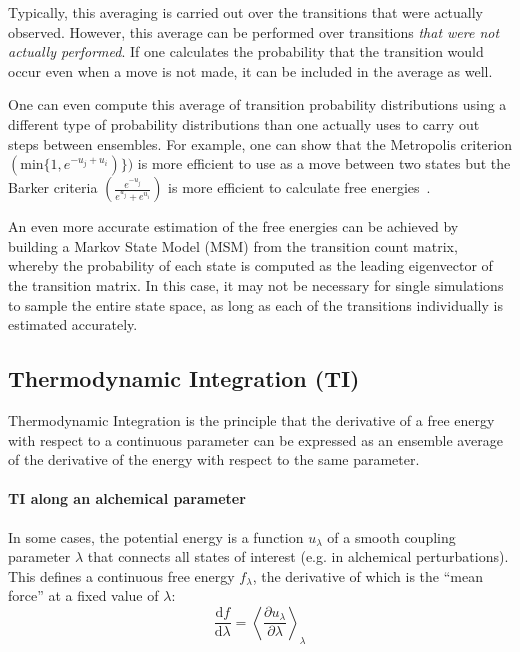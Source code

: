 \documentclass[9pt,review]{livecoms}
\begin{document}
Typically, this averaging is carried out over the transitions that were actually observed. However, this average can be performed over transitions \emph{that were not actually performed}. If one calculates the probability that the transition would occur even when a move is not made, it can be included in the average as well.

One can even compute this average of transition probability distributions using a different type of  probability distributions than one actually uses to carry out steps between ensembles. For example, one can show that the Metropolis criterion $(\mathrm{min} \{1,e^{-u_j+u_i})\})$ is more efficient to use as a move between two states but the Barker criteria $\left(\frac{e^{-u_j}}{e^{u_j}+e^{u_i}}\right)$ is more efficient to calculate free energies~\citep{Liu:Biometrika:1996}.

An even more accurate estimation of the free energies can be achieved by building a Markov State Model (MSM) from the transition count matrix, whereby the probability of each state is computed as the leading eigenvector of the transition matrix. In this case, it may not be necessary for single simulations to sample the entire state space, as long as each of the transitions individually is estimated accurately.

\subsection{Thermodynamic Integration (TI)}
\label{sec:fe_estimators:TI}

Thermodynamic Integration is the principle that the derivative of a free energy with respect to a continuous parameter can be expressed as an ensemble average of the derivative of the energy with respect to the same parameter.

\paragraph{TI along an alchemical parameter} In some cases, the potential energy is a function $u_\lambda$ of a smooth coupling parameter $\lambda$ that connects all states of interest (e.g. in alchemical perturbations).
This defines a continuous free energy $f_\lambda$, the derivative of which is the ``mean force'' at a fixed value of $\lambda$:
\begin{equation}
\frac{\mathrm{d}f}{\mathrm{d}\lambda} =\left\langle \frac{\partial u_\lambda}{\partial \lambda} \right\rangle_\lambda
\label{eq:TI1}
\end{equation}
\end{document}
